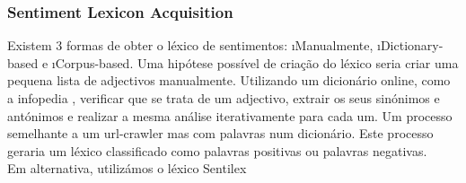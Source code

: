 \subsubsection{Sentiment Lexicon Acquisition}
Existem 3 formas de obter o léxico de sentimentos: \i{Manualmente}, \i{Dictionary-based} e \i{Corpus-based}. Uma hipótese possível de criação do léxico seria criar uma pequena lista de adjectivos manualmente. Utilizando um dicionário online, como a infopedia \cite{infopedia}, verificar que se trata de um adjectivo, extrair os seus sinónimos e antónimos e realizar a mesma análise iterativamente para cada um. Um processo semelhante a um url-crawler mas com palavras num dicionário. Este processo geraria um léxico classificado como palavras positivas ou palavras negativas.\\
Em alternativa, utilizámos o léxico Sentilex \cite{sentilex}